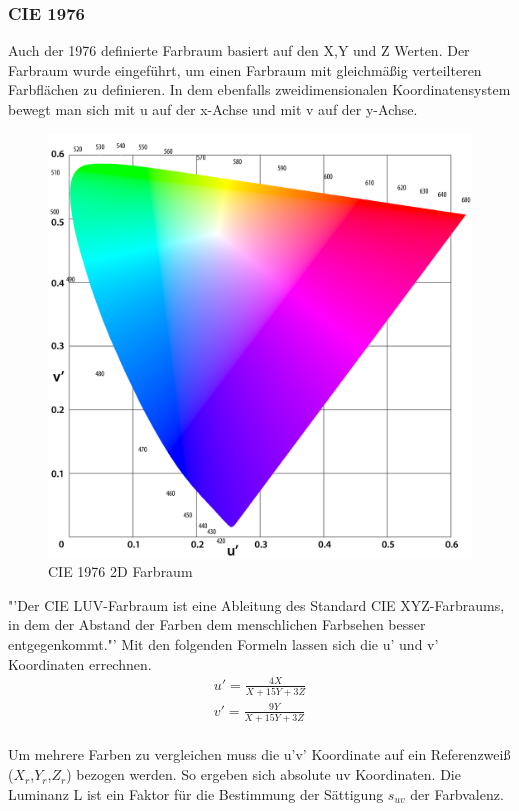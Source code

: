 \documentclass[11pt]{scrartcl}
\begin{document}
\subsubsection{CIE 1976}
Auch der 1976 definierte Farbraum basiert auf den X,Y und Z Werten. Der Farbraum wurde eingeführt, um einen Farbraum mit gleichmäßig verteilteren Farbflächen zu
definieren. In dem ebenfalls zweidimensionalen Koordinatensystem bewegt man sich mit u auf der x-Achse und mit v auf der y-Achse.
\begin{figure}[H]
    \begin{center}
        \includegraphics[width=.7\textwidth]{images/cie_1976.png}
    \end{center}
    \caption{CIE 1976 2D Farbraum \cite{wikipedia1976}}
\end{figure}
\noindent
"'Der CIE LUV-Farbraum ist eine Ableitung des Standard CIE XYZ-Farbraums, in dem der Abstand der Farben dem menschlichen Farbsehen besser entgegenkommt."' \cite{wisotopLuv}
Mit den folgenden Formeln lassen sich die u' und v' Koordinaten errechnen.
\begin{align}\label{Equ:9}
    u' = \frac{4X}{X+15Y+3Z}\\
    v' = \frac{9Y}{X+15Y+3Z}
\end{align}
\cite{lindbloom}\\
Um mehrere Farben zu vergleichen muss die u'v' Koordinate auf ein Referenzweiß ($X_r$,$Y_r$,$Z_r$) bezogen werden. So ergeben sich absolute uv Koordinaten. Die Luminanz
L ist ein Faktor für die Bestimmung der Sättigung $s_{uv}$ der Farbvalenz. \cite{wikipedia1976}
\end{document}
